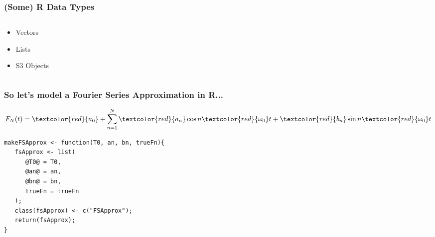\documentclass{beamer}
\begin{document}
\begin{frame}
   \frametitle{(Some) R Data Types}
   \begin{columns}
      \begin{column}{5cm}
         \begin{itemize}
            \item \alert<1>{Vectors}
            \item \alert<2>{Lists}
            \item \alert<3>{S3 Objects}
         \end{itemize}
      \end{column}
      \begin{column}{5cm}
      \end{column}
   \end{columns}
\end{frame}

\begin{frame}[fragile]
   \frametitle{So let's model a Fourier Series Approximation in R...}
   \[
      F_{N}(t) = \textcolor{red}{a_{0}} + \sum_{n=1}^{N}
      \textcolor{red}{a_{n}} \cos n \textcolor{red}{\omega_{0}} t + 
      \textcolor{red}{b_{n}} \sin n \textcolor{red}{\omega_{0}} t
   \]
   \begin{center}
   \begin{minipage}{100mm}
   \begin{lstlisting}[style=WithHighlights]
makeFSApprox <- function(T0, an, bn, trueFn){
   fsApprox <- list(
      @T0@ = T0,
      @an@ = an,
      @bn@ = bn,
      trueFn = trueFn
   );
   class(fsApprox) <- c("FSApprox");
   return(fsApprox);
}
   \end{lstlisting}
   \end{minipage}
   \end{center}
\end{frame}
\end{document}
